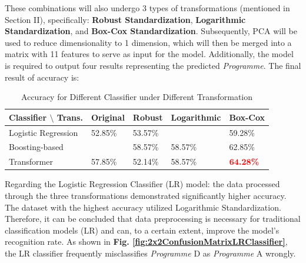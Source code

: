 \documentclass[conference]{IEEEtran}
\begin{document}

These combinations will also undergo 3 types of transformations (mentioned in Section II), specifically: \textbf{Robust Standardization}, \textbf{Logarithmic Standardization}, and \textbf{Box-Cox Standardization}. Subsequently, PCA will be used to reduce dimensionality to 1 dimension, which will then be merged into a matrix with 11 features to serve as input for the model. Additionally, the model is required to output four results representing the predicted \textit{Programme}. The final result of accuracy is:
\begin{table}[h!]
    \centering
    \caption{Accuracy for Different Classifier under Different Transformation}
    \begin{tabular}{lllll}
        \toprule
        \textbf{Classifier $\setminus$ Trans.} & \textbf{Original}& \textbf{Robust}& \textbf{Logarithmic}& \textbf{Box-Cox} \\
        \midrule
        Logistic Regression & 52.85\%	&53.57\%&	\textbf{\color{red}{60.71\%}}&	59.28\%\\
        Boosting-based & \textbf{\color{red}{65.00\%}}&	58.57\%&	58.57\%&	62.85\%\\
        Transformer & 57.85\%	&52.14\%	&58.57\%&	$\color{red}\textbf{64.28\%}$\\
        \bottomrule
    \end{tabular}
    \label{fig:accuracyResult}
\end{table}


Regarding the Logistic Regression Classifier (LR) model: the data processed through the three transformations demonstrated significantly higher accuracy. The dataset with the highest accuracy utilized Logarithmic Standardization. Therefore, it can be concluded that data preprocessing is necessary for traditional classification models (LR) and can, to a certain extent, improve the model's recognition rate. As shown in \textbf{Fig. \ref{fig:2x2ConfusionMatrixLRClassifier}}, the LR classifier frequently misclassifies \textit{Programme} D as \textit{Programme} A wrongly.
\end{document}
